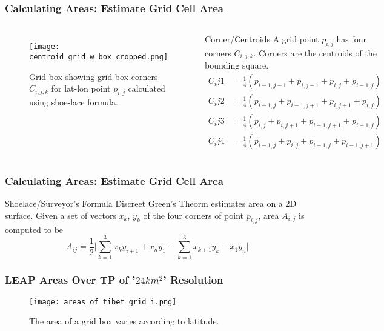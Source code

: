 \begin{frame}
\frametitle{Calculating Areas: Estimate Grid Cell Area}
\begin{columns}
\begin{figure}[ht]
\centering
\begin{minipage}{1\columnwidth}
\texttt{[image: centroid\_grid\_w\_box\_cropped.png]}
\caption{Grid box showing grid box corners $C_{i,j,k}$ for lat-lon point $p_{i,j}$ calculated using shoe-lace formula.}
\end{minipage}
\end{figure}
\begin{block}{Corner/Centroids}
A grid point $p_{i,j}$ has four corners $C_{i,j,k}$. Corners are the centroids of the bounding square.
\begin{align*}
C_ij1 &= \frac{1}{4}( p_{i-1,j-1}+ p_{i,j-1}+ p_{i,j} + p_{i-1,j} ) \\
C_ij2 &= \frac{1}{4}( p_{i-1,j}+ p_{i-1,j+1} + p_{i,j+1}+ p_{i,j} ) \\
C_ij3 &= \frac{1}{4}( p_{i,j}+ p_{i,j+1} + p_{i+1,j+1}+ p_{i+1,j} ) \\
C_ij4 &= \frac{1}{4}( p_{i-1,j}+ p_{i,j} + p_{i+1,j} + p_{i-1,j+1} )
\end{align*}
\end{block}
\end{columns}
\end{frame}

\begin{frame}
\frametitle{Calculating Areas: Estimate Grid Cell Area}
\begin{block}{Shoelace/Surveyor's Formula}
Discreet Green's Theorm estimates area on a 2D surface. Given a set of vectors $x_k$, $y_k$ of the four corners of point $p_{i,j}$, area $A_{i,j}$ is computed to be
\begin{equation*}
A_{ij} = \frac{1}{2} \vert \sum\limits_{k=1}^{3}x_{k}y_{i+1} + x_{n}y_{1} - \sum\limits_{k=1}^{3}x_{k+1}y_{k} - x_{1}y_{n} \vert 
\end{equation*}
\end{block}
\end{frame}

\begin{frame}
\frametitle{LEAP Areas Over TP of '$24km^{2}$' Resolution}
\begin{figure}
\vspace*{-.5cm}
\centering
\begin{minipage}{.5\columnwidth}
\texttt{[image: areas\_of\_tibet\_grid\_i.png]}
\caption{\tiny{The area of a grid box varies according to latitude.}}
\end{minipage}
\end{figure}
\end{frame}


